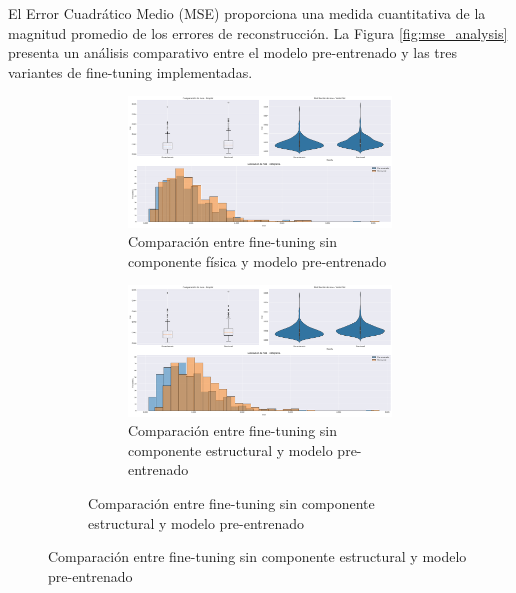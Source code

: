 El Error Cuadrático Medio (MSE) proporciona una medida cuantitativa de la magnitud promedio de los errores de reconstrucción. La Figura \ref{fig:mse_analysis} presenta un análisis comparativo entre el modelo pre-entrenado y las tres variantes de fine-tuning implementadas.

\begin{figure}
    \begin{figure}[H]
        \centering
        \begin{subfigure}[b]{0.48\textwidth}
            \centering
            \includegraphics[width=\textwidth]{Images/comparison_plots_mse_no_phy.png}
            \caption{Comparación entre fine-tuning sin componente física y modelo pre-entrenado}
            \label{fig:mse_completo}
        \end{subfigure}
        \hfill
        \begin{subfigure}[b]{0.48\textwidth}
            \centering
            \includegraphics[width=\textwidth]{Images/comparison_plots_mse_no_struct.png}
            \caption{Comparación entre fine-tuning sin componente estructural y modelo pre-entrenado}
            \label{fig:mse_no_struct}
        \end{subfigure}
        

\end{figure}
\end{figure}
